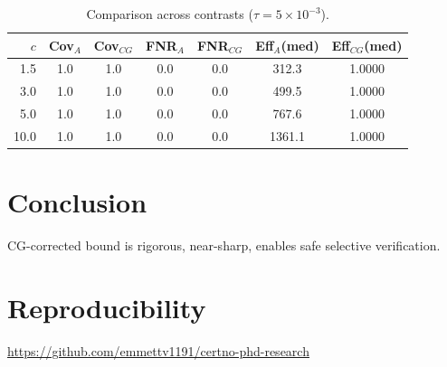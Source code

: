 \documentclass[conference]{IEEEtran}
\begin{document}
\begin{table}[t]
\centering
\caption{Comparison across contrasts ($\tau=5\times 10^{-3}$).}
\label{tab:comp}
\begin{tabular}{rcccccc}
\toprule
$c$ & Cov$_A$ & Cov$_{CG}$ & FNR$_A$ & FNR$_{CG}$ & Eff$_A$(med) & Eff$_{CG}$(med)\\
\midrule
1.5 & 1.0 & 1.0 & 0.0 & 0.0 & 312.3 & 1.0000\\
3.0 & 1.0 & 1.0 & 0.0 & 0.0 & 499.5 & 1.0000\\
5.0 & 1.0 & 1.0 & 0.0 & 0.0 & 767.6 & 1.0000\\
10.0 & 1.0 & 1.0 & 0.0 & 0.0 & 1361.1 & 1.0000\\
\bottomrule
\end{tabular}
\end{table}

\section{Conclusion}
CG-corrected bound is rigorous, near-sharp, enables safe selective verification.

\section*{Reproducibility}
\url{https://github.com/emmettv1191/certno-phd-research}
\end{document}
